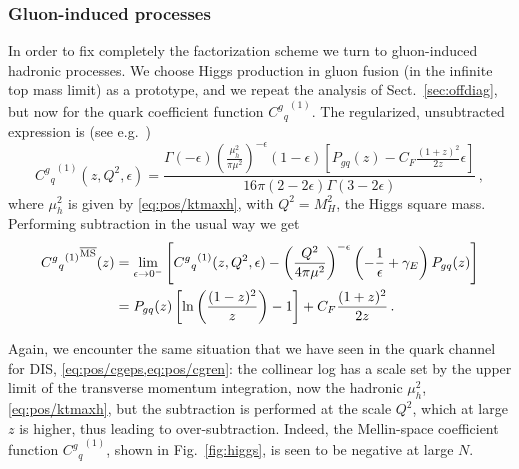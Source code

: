 \subsubsection{Gluon-induced processes}
\label{sec:higgs}
In order to fix completely the factorization scheme we turn to
gluon-induced hadronic processes. We choose Higgs production in gluon
fusion (in the infinite top mass limit) as a prototype, and we repeat the  analysis of
Sect.~\ref{sec:offdiag}, but now for the quark coefficient function
${{{C^g}_q}^{(1)}}$. The regularized, unsubtracted expression is (see
e.g.~\cite{Maltoni:2018dar}) 
\begin{equation}\label{eq:pos/cgqeps}
{C^g{}_q}^{(1)}(z,Q^2,\epsilon) =
  \frac{ \Gamma(-\epsilon)
  \left(\frac{\mu_h^2}{\pi\mu^2}\right)^{-\epsilon} (1-\epsilon) \left[P_{gq}(z) - C_F \frac{(1+z)^2}{2z} \epsilon \right]}{16\pi (2 - 2\epsilon) \Gamma (3 - 2 \epsilon)}\,,
\end{equation}
where $\mu_h^2$ is given by \cref{eq:pos/ktmaxh}, with $Q^2=M_H^2$,
the Higgs square mass.
Performing  \msbar{} subtraction in the usual way we get
\begin{align}\label{eq:pos/cgqren}
{  {C^g{}_q}^{(1)}}^{{\overline{\textrm{MS}}}}(z) &= \lim_{\epsilon\to
  0^-}\left[{{C^{g}}_q}^{(1)}(z,Q^2,\epsilon) - \left(\frac{Q^2}{4\pi
      \mu^2}\right)^{-\epsilon} \left(-\frac 1
    {\epsilon}+\gamma_E\right) P_{gq}(z)\right]\\
&= P_{gq}(z)\left[\ln\left(\frac{(1-z)^2}{z}\right) - 1 \right]  + C_F \frac{(1+z)^2}{2z} 
 \,.\label{eq:pos/cgqnlo}
\end{align}

Again, we encounter the same situation that we have seen in the quark
channel for DIS, \cref{eq:pos/cgeps,eq:pos/cgren}: the collinear
log has a scale set by the upper limit of the transverse momentum
integration, now the hadronic $\mu_h^2$, \cref{eq:pos/ktmaxh}, but the
\msbar{} subtraction is performed at the scale $Q^2$, which at large $z$
is higher, thus leading to over-subtraction. Indeed, the Mellin-space
\msbar{} coefficient function  ${{{C^g}_q}^{(1)}}$, shown in
Fig.~\ref{fig:higgs}, is seen to be negative at large $N$.


